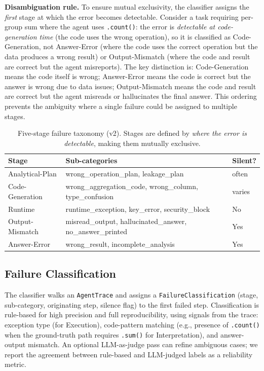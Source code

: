 \textbf{Disambiguation rule.} To ensure mutual exclusivity, the classifier assigns the \emph{first} stage at which the error becomes detectable. Consider a task requiring per-group sum where the agent uses \texttt{.count()}: the error is \emph{detectable at code-generation time} (the code uses the wrong operation), so it is classified as Code-Generation, not Answer-Error (where the code uses the correct operation but the data produces a wrong result) or Output-Mismatch (where the code and result are correct but the agent misreports). The key distinction is: Code-Generation means the code itself is wrong; Answer-Error means the code is correct but the answer is wrong due to data issues; Output-Mismatch means the code and result are correct but the agent misreads or hallucinates the final answer. This ordering prevents the ambiguity where a single failure could be assigned to multiple stages.

\begin{table}[t]
\centering
\caption{Five-stage failure taxonomy (v2). Stages are defined by \emph{where the error is detectable}, making them mutually exclusive.}
\label{tab:taxonomy}
\small
\begin{tabular}{@{}lll@{}}
\toprule
Stage & Sub-categories & Silent? \\
\midrule
Analytical-Plan & wrong\_operation\_plan, leakage\_plan & often \\
Code-Generation & wrong\_aggregation\_code, wrong\_column, type\_confusion & varies \\
Runtime & runtime\_exception, key\_error, security\_block & No \\
Output-Mismatch & misread\_output, hallucinated\_answer, no\_answer\_printed & Yes \\
Answer-Error & wrong\_result, incomplete\_analysis & Yes \\
\bottomrule
\end{tabular}
\end{table}

\subsection{Failure Classification}
\label{sec:classifier}

The classifier walks an \texttt{AgentTrace} and assigns a \texttt{FailureClassification} (stage, sub-category, originating step, silence flag) to the first failed step. Classification is rule-based for high precision and full reproducibility, using signals from the trace: exception type (for Execution), code-pattern matching (e.g., presence of \texttt{.count()} when the ground-truth path requires \texttt{.sum()} for Interpretation), and answer-output mismatch. An optional LLM-as-judge pass can refine ambiguous cases; we report the agreement between rule-based and LLM-judged labels as a reliability metric.


